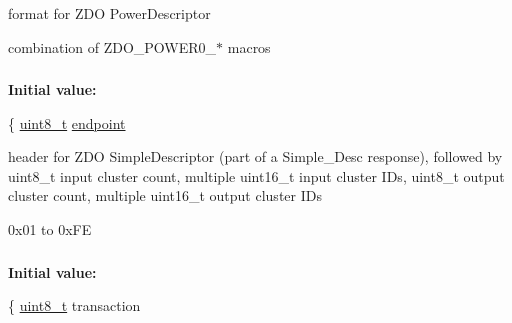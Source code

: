 format for Z\-D\-O Power\-Descriptor 

combination of Z\-D\-O\-\_\-\-P\-O\-W\-E\-R0\-\_\-$\ast$ macros \hypertarget{group__zdo_ga2fcb208122b12b93deec95fa934cf40d}{
\subsubsection[{zdo\-\_\-simple\-\_\-desc\-\_\-header\-\_\-t}]{}}\label{group__zdo_ga2fcb208122b12b93deec95fa934cf40d}
{\bfseries Initial value\-:}
\begin{DoxyCode}
\{
   \hyperlink{group__hal_gae1affc9ca37cfb624959c866a73f83c2}{uint8\_t}    \hyperlink{group__zdo_ga7d397493728da2bca8d55b2d61c4ec5d}{endpoint}
\end{DoxyCode}


header for Z\-D\-O Simple\-Descriptor (part of a Simple\-\_\-\-Desc response), followed by uint8\-\_\-t input cluster count, multiple uint16\-\_\-t input cluster I\-Ds, uint8\-\_\-t output cluster count, multiple uint16\-\_\-t output cluster I\-Ds 

0x01 to 0x\-F\-E \hypertarget{group__zdo_gaa612a19982dc0c39d207a0662e8a0761}{
\subsubsection[{zdo\-\_\-simple\-\_\-desc\-\_\-req\-\_\-t}]{}}\label{group__zdo_gaa612a19982dc0c39d207a0662e8a0761}
{\bfseries Initial value\-:}
\begin{DoxyCode}
\{
   \hyperlink{group__hal_gae1affc9ca37cfb624959c866a73f83c2}{uint8\_t}    transaction
\end{DoxyCode}


